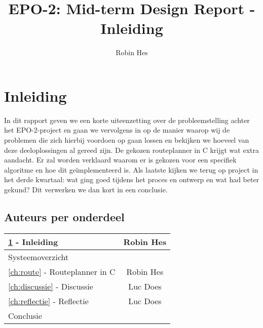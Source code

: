 \documentclass{report}
\title{EPO-2: Mid-term Design Report - Inleiding}
\author{Robin Hes}
\begin{document}
\chapter{Inleiding}
\label{ch:inleiding}

In dit rapport geven we een korte uiteenzetting over de probleemstelling achter het EPO-2-project en gaan we vervolgens in op de manier waarop wij de problemen die zich hierbij voordoen op gaan lossen en bekijken we hoeveel van deze deeloplossingen al gereed zijn. De gekozen routeplanner in C krijgt wat extra aandacht. Er zal worden verklaard waarom er is gekozen voor een specifiek algoritme en hoe dit geïmplementeerd is. Als laatste kijken we terug op project in het derde kwartaal: wat ging goed tijdens het proces en ontwerp en wat had beter gekund? Dit verwerken we dan kort in een conclusie. 

\section{Auteurs per onderdeel}

\begin{tabular}[l]{| l | c |}
	\hline
	\ref{ch:inleiding} - Inleiding & Robin Hes \\
	\hline
	Systeemoverzicht & \\
	\hline
	\ref{ch:route} - Routeplanner in C & Robin Hes \\
	\hline
	\ref{ch:discussie} - Discussie & Luc Does\\
	\hline
	\ref{ch:reflectie} - Reflectie & Luc Does \\
	\hline
	Conclusie & \\
	\hline	
\end{tabular}
\end{document}

